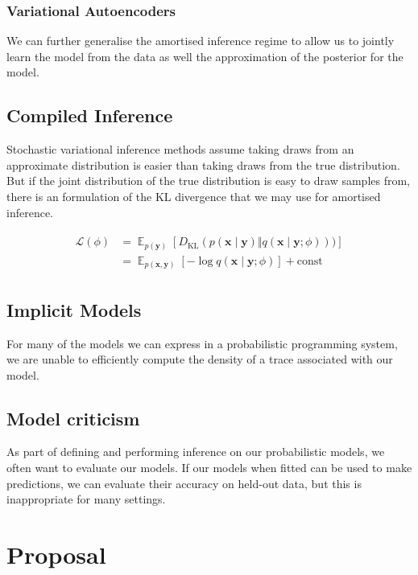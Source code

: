 \documentclass[12pt]{article}
\DeclareMathOperator{\E}{\mathbb{E}}
\newcommand{\KL}[2]{D_{\text{KL}}\left(#1 \Vert #2\right)}
\newcommand{\given}{\mid}
\renewcommand{\vec}[1]{\boldsymbol{\mathbf{#1}}}
\theoremstyle{definition}
\begin{document}
\subsubsection{Variational Autoencoders}

We can further generalise the amortised inference regime to allow us to
jointly learn the model from the data as well the approximation of
the posterior for the model.

\subsection{Compiled Inference}

Stochastic variational inference methods assume taking draws from an
approximate distribution is easier than taking draws from the true
distribution. But if the joint distribution of the true distribution
is easy to draw samples from, there is an formulation of the KL
divergence that we may use for amortised inference.

\begin{align}
  \begin{split}
    \mathcal{L}(\phi) & = \E_{p(\mathbf{y})}\left[\KL{p(\vec x \given \vec y)}{q(\vec x \given \vec y; \phi)})\right] \\
    & = \E_{p(\vec x, \vec y)} \left[-\log q(\vec x \given \vec y; \phi)\right] + \text{const}
  \end{split}
\end{align}

\subsection{Implicit Models}

For many of the models we can express in a probabilistic programming
system, we are unable to efficiently compute the density of a trace
associated with our model.

\subsection{Model criticism}

As part of defining and performing inference on our probabilistic
models, we often want to evaluate our models. If our models when fitted
can be used to make predictions, we can evaluate their accuracy on
held-out data, but this is inappropriate for many settings.

\section{Proposal}
\end{document}

